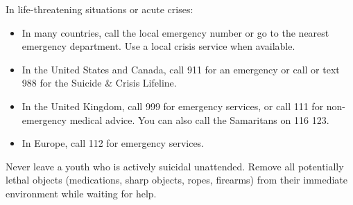 In life-threatening situations or acute crises:
\begin{itemize}
    \item In many countries, call the local emergency number or go to the nearest emergency department. Use a local crisis service when available.
    \item In the United States and Canada, call 911 for an emergency or call or text 988 for the Suicide \& Crisis Lifeline.
    \item In the United Kingdom, call 999 for emergency services, or call 111 for non-emergency medical advice. You can also call the Samaritans on 116 123.
    \item In Europe, call 112 for emergency services.
\end{itemize}
Never leave a youth who is actively suicidal unattended. Remove all potentially lethal objects (medications, sharp objects, ropes, firearms) from their immediate environment while waiting for help.

